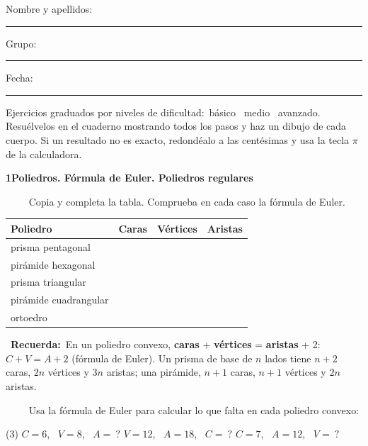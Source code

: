 \documentclass[11pt,a4paper]{article}
\newcommand{\estrelles}[1]{{\color{accent}\ifcase#1\or\faStar\faStar[regular]\faStar[regular]\or\faStar\faStar\faStar[regular]\or\faStar\faStar\faStar\fi}}
\newcounter{exer}
\newcommand{\ex}[1]{\par\needspace{4\baselineskip}\medskip\stepcounter{exer}\noindent{\color{navy}\bfseries\theexer.}\ \ {\small\estrelles{#1}}\ \ }
\newcommand{\seccio}[2]{\par\needspace{10\baselineskip}\bigskip
  \begin{tcolorbox}[colback=navy,colframe=navy,coltext=white,arc=2mm,boxrule=0pt,left=3mm,right=3mm,top=1.2mm,bottom=1.2mm]
  {\large\bfseries #1\quad #2}
  \end{tcolorbox}\vspace{-2pt}}
\newcommand{\recorda}[1]{\par\smallskip\begin{tcolorbox}[colback=accent!7,colframe=accent!55,arc=2mm,boxrule=0.5pt,left=2.5mm,right=2.5mm,top=1mm,bottom=1mm]\small{\color{accent}\faLightbulb[regular]}\ \textbf{Recuerda:}\ #1\end{tcolorbox}}
\begin{document}
\thispagestyle{primera}

\vspace{10pt}
Nombre y apellidos: \rule{6.6cm}{0.4pt}\hfill Grupo: \rule{1.6cm}{0.4pt}\hfill Fecha: \rule{2.2cm}{0.4pt}
\vspace{8pt}

\begin{tcolorbox}[colback=soft,colframe=soft,arc=2mm,left=3mm,right=3mm,top=1.5mm,bottom=1.5mm]
\small Ejercicios graduados por niveles de dificultad:\quad \estrelles{1}\ básico \qquad \estrelles{2}\ medio \qquad \estrelles{3}\ avanzado.\\[2pt] Resuélvelos en el cuaderno mostrando todos los pasos y haz un dibujo de cada cuerpo. Si un resultado no es exacto, redondéalo a las centésimas y usa la tecla $\pi$ de la calculadora.
\end{tcolorbox}

\seccio{1}{Poliedros. Fórmula de Euler. Poliedros regulares}

\ex{1} Copia y completa la tabla. Comprueba en cada caso la fórmula de Euler.\par\smallskip\begin{center}\renewcommand{\arraystretch}{1.25}\begin{tabular}{|l|C{1.6cm}|C{1.6cm}|C{1.6cm}|}\hline Poliedro & Caras & Vértices & Aristas \\\hline prisma pentagonal & & &  \\\hline pirámide hexagonal & & &  \\\hline prisma triangular & & &  \\\hline pirámide cuadrangular & & &  \\\hline ortoedro & & &  \\\hline\end{tabular}\end{center}\recorda{En un poliedro convexo, \textbf{caras} + \textbf{vértices} = \textbf{aristas} + 2: \ $C+V=A+2$ (fórmula de Euler). Un prisma de base de $n$ lados tiene $n+2$ caras, $2n$ vértices y $3n$ aristas; una pirámide, $n+1$ caras, $n+1$ vértices y $2n$ aristas.}

\ex{1} Usa la fórmula de Euler para calcular lo que falta en cada poliedro convexo:\begin{tasks}(3)
  \task $C=6$, \ $V=8$, \ $A=\ ?$
  \task $V=12$, \ $A=18$, \ $C=\ ?$
  \task $C=7$, \ $A=12$, \ $V=\ ?$
\end{tasks}
\end{document}
